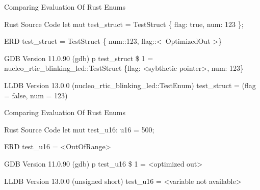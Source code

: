 
\begin{frame}{Comparing Evaluation Of Rust Enums}
	\begin{alertblock}{Rust Source Code}
		let mut test\_struct = TestStruct \{ flag: true, num: 123 \};
    	\end{alertblock}

	\begin{block}{ERD}
		test\_struct = TestStruct \{ num::123, flag::\textless \ OptimizedOut \textgreater \}
    	\end{block}

    	\begin{block}{GDB Version 11.0.90}
		(gdb) p test\_struct\newline
		\$ 1 = nucleo\_rtic\_blinking\_led::TestStruct \{flag: \textless sybthetic pointer\textgreater, num: 123\}
    	\end{block}

    	\begin{block}{LLDB Version 13.0.0}
		(nucleo\_rtic\_blinking\_led::TestEnum) test\_struct = (flag = false, num = 123)
    	\end{block}
\end{frame}


\begin{frame}{Comparing Evaluation Of Rust Enums}
	\begin{alertblock}{Rust Source Code}
		let mut test\_u16: u16 = 500;
    	\end{alertblock}

	\begin{block}{ERD}
		test\_u16 = \textless OutOfRange\textgreater
    	\end{block}

    	\begin{block}{GDB Version 11.0.90}
		(gdb) p test\_u16\newline
		\$ 1 = \textless optimized out\textgreater
    	\end{block}

    	\begin{block}{LLDB Version 13.0.0}
		(unsigned short) test\_u16 = \textless variable not available\textgreater
    	\end{block}
\end{frame}


